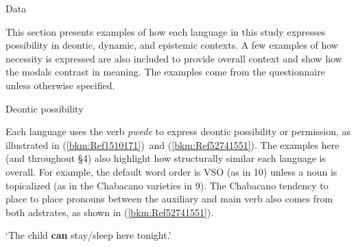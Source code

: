 \begin{listWWNumiiileveli}
\item 
\begin{stylelsSectioni}
Data
\end{stylelsSectioni}
\end{listWWNumiiileveli}
\begin{styleStandard}
This section presents examples of how each language in this study expresses possibility in deontic, dynamic, and epistemic contexts. A few examples of how necessity is expressed are also included to provide overall context and show how the modals contrast in meaning. The examples come from the questionnaire unless otherwise specified.
\end{styleStandard}

\begin{listWWNumiiileveli}
\item 
\begin{listWWNumiiilevelii}
\item 
\begin{stylelsSectionii}
Deontic possibility
\end{stylelsSectionii}
\end{listWWNumiiilevelii}
\end{listWWNumiiileveli}
\begin{styleStandard}
Each language uses the verb \textit{pwede} to express deontic possibility or permission, as illustrated in (\ref{bkm:Ref1510171})\ and (\ref{bkm:Ref52741551}). The examples here (and throughout §4) also highlight how structurally similar each language is overall. For example, the default word order is VSO (as in 10) unless a noun is topicalized (as in the Chabacano varieties in 9). The Chabacano tendency to place to place pronouns between the auxiliary and main verb also comes from both adstrates, as shown in (\ref{bkm:Ref52741551}). \ 
\end{styleStandard}


\setcounter{listWWNumiileveli}{0}
\begin{listWWNumiileveli}
\item 
\begin{stylelsLanginfo}
 \label{bkm:Ref1510171}
\end{stylelsLanginfo}
\end{listWWNumiileveli}
\begin{stylelsLanginfo}
‘The child \textbf{can }stay/sleep here tonight.’
\end{stylelsLanginfo}

